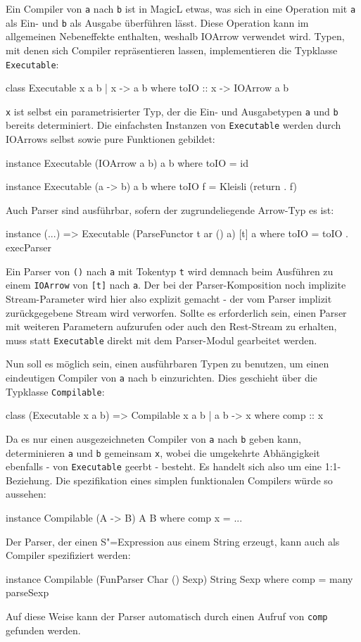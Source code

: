\documentclass[11pt, a4paper, bibgerm]{scrbook}
\newcommand\icode[1]{\lstinline?#1?}
\newcommand{\sexp}{S"=Expression}
\begin{document}
Ein Compiler von \icode{a} nach \icode{b} ist in MagicL etwas, was sich
in eine Operation mit \icode{a} als Ein- und \icode{b} als Ausgabe
überführen lässt. Diese Operation kann im allgemeinen Nebeneffekte
enthalten, weshalb IOArrow verwendet wird. Typen, mit denen sich
Compiler repräsentieren lassen, implementieren die Typklasse
\icode{Executable}:
\begin{code}
class Executable x a b | x -> a b where
  toIO :: x -> IOArrow a b
\end{code}
\icode{x} ist selbst ein parametrisierter Typ, der die Ein- und
Ausgabetypen \icode{a} und \icode{b} bereits determiniert. Die einfachsten
Instanzen von \icode{Executable} werden durch IOArrows selbst sowie pure
Funktionen gebildet:
\begin{code}
instance Executable (IOArrow a b) a b where
  toIO = id

instance Executable (a -> b) a b where
  toIO f = Kleisli (return . f)
\end{code}
Auch Parser sind ausführbar, sofern der zugrundeliegende Arrow-Typ es
ist:
\begin{code}
instance (...) => Executable (ParseFunctor t ar () a) [t] a where
  toIO = toIO . execParser
\end{code}
Ein Parser von \icode{()} nach \icode{a} mit Tokentyp \icode{t} wird
demnach beim Ausführen zu einem \icode{IOArrow} von \icode{[t]} nach
\icode{a}. Der bei der Parser-Komposition noch implizite
Stream-Parameter wird hier also explizit gemacht - der vom Parser
implizit zurückgegebene Stream wird verworfen. Sollte es erforderlich
sein, einen Parser mit weiteren Parametern aufzurufen oder auch den
Rest-Stream zu erhalten, muss statt \icode{Executable} direkt mit dem
Parser-Modul gearbeitet werden.

Nun soll es möglich sein, einen ausführbaren Typen zu benutzen, um einen
eindeutigen Compiler von \icode{a} nach {b} einzurichten. Dies geschieht
über die Typklasse \icode{Compilable}:
\begin{code}
class (Executable x a b) => Compilable x a b | a b -> x where
  comp :: x
\end{code}
Da es nur einen ausgezeichneten Compiler von \icode{a} nach \icode{b}
geben kann, determinieren \icode{a} und \icode{b} gemeinsam \icode{x},
wobei die umgekehrte Abhängigkeit ebenfalls - von \icode{Executable}
geerbt - besteht. Es handelt sich also um eine 1:1-Beziehung. Die
spezifikation eines simplen funktionalen Compilers würde so aussehen:
\begin{code}
instance Compilable (A -> B) A B where
  comp x = ...
\end{code}
Der Parser, der einen \sexp{} aus einem String erzeugt, kann auch als
Compiler spezifiziert werden:
\begin{code}
instance Compilable (FunParser Char () Sexp) String Sexp where
  comp = many parseSexp
\end{code}
Auf diese Weise kann der Parser automatisch durch einen Aufruf von
\icode{comp} gefunden werden.
\end{document}
